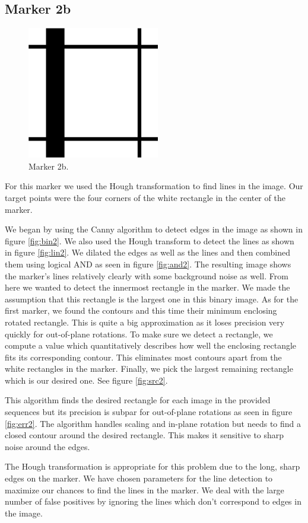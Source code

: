 \documentclass[]{scrartcl}
\begin{document}
\subsection{Marker 2b}
\begin{figure}
	\centering
	\includegraphics[width=0.4\linewidth]{fig/marker2b.png}
	\caption{Marker 2b.}
	\label{fig:mar2}
\end{figure}
For this marker we used the Hough transformation to find lines in the image. Our target points were the four corners of the white rectangle in the center of the marker.\par
We began by using the Canny algorithm to detect edges in the image as shown in figure \ref{fig:bin2}. We also used the Hough transform to detect the lines as shown in figure \ref{fig:lin2}. We dilated the edges as well as the lines and then combined them using logical AND as seen in figure \ref{fig:and2}. The resulting image shows the marker's lines relatively clearly with some background noise as well. From here we wanted to detect the innermost rectangle in the marker. We made the assumption that this rectangle is the largest one in this binary image. As for the first marker, we found the contours and this time their minimum enclosing rotated rectangle. This is quite a big approximation as it loses precision very quickly for out-of-plane rotations. To make sure we detect a rectangle, we compute a value which quantitatively describes how well the enclosing rectangle fits its corresponding contour. This eliminates most contours apart from the white rectangles in the marker. Finally, we pick the largest remaining rectangle which is our desired one. See figure \ref{fig:src2}.\par
This algorithm finds the desired rectangle for each image in the provided sequences but its precision is subpar for out-of-plane rotations as seen in figure \ref{fig:err2}. The algorithm handles scaling and in-plane rotation but needs to find a closed contour around the desired rectangle. This makes it sensitive to sharp noise around the edges.\par
The Hough transformation is appropriate for this problem due to the long, sharp edges on the marker. We have chosen parameters for the line detection to maximize our chances to find the lines in the marker. We deal with the large number of false positives by ignoring the lines which don't correspond to edges in the image.\par
\end{document}
